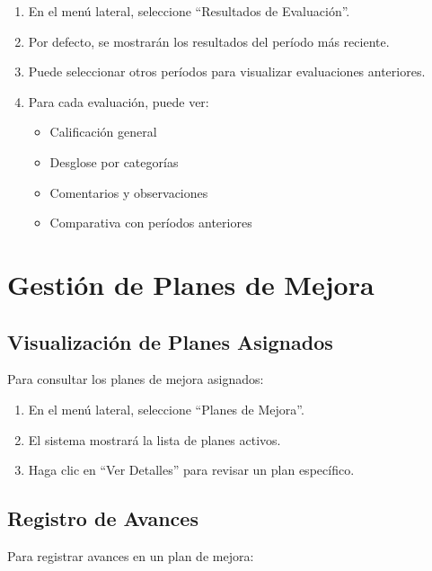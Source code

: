 \documentclass[12pt,a4paper]{book}
\begin{document}
\begin{enumerate}
    \item En el menú lateral, seleccione ``Resultados de Evaluación''.
    \item Por defecto, se mostrarán los resultados del período más reciente.
    \item Puede seleccionar otros períodos para visualizar evaluaciones anteriores.
    \item Para cada evaluación, puede ver:
    \begin{itemize}
        \item Calificación general
        \item Desglose por categorías
        \item Comentarios y observaciones
        \item Comparativa con períodos anteriores
    \end{itemize}
\end{enumerate}

\section{Gestión de Planes de Mejora}
\subsection{Visualización de Planes Asignados}
Para consultar los planes de mejora asignados:

\begin{enumerate}
    \item En el menú lateral, seleccione ``Planes de Mejora''.
    \item El sistema mostrará la lista de planes activos.
    \item Haga clic en ``Ver Detalles'' para revisar un plan específico.
\end{enumerate}

\subsection{Registro de Avances}
Para registrar avances en un plan de mejora:
\end{document}
